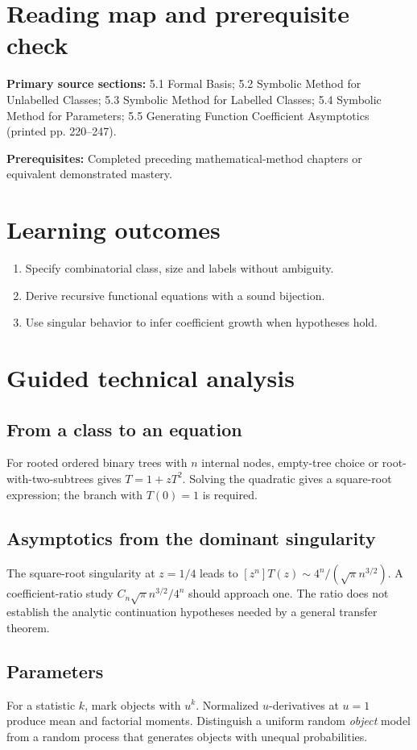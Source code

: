\documentclass[11pt]{article}
\begin{document}
\makedoctocpage
\section{Reading map and prerequisite check}
\noindent\textbf{Primary source sections:} 5.1 Formal Basis; 5.2 Symbolic Method for Unlabelled Classes; 5.3 Symbolic Method for Labelled Classes; 5.4 Symbolic Method for Parameters; 5.5 Generating Function Coefficient Asymptotics (printed pp. 220--247).\par
\noindent\textbf{Prerequisites:} Completed preceding mathematical-method chapters or equivalent demonstrated mastery.\par
\section{Learning outcomes}
\begin{enumerate}
\item Specify combinatorial class, size and labels without ambiguity.
\item Derive recursive functional equations with a sound bijection.
\item Use singular behavior to infer coefficient growth when hypotheses hold.
\end{enumerate}
\section{Guided technical analysis}
\subsection{From a class to an equation}
For rooted ordered binary trees with $n$ internal nodes, empty-tree choice or root-with-two-subtrees gives $T=1+zT^2$. Solving the quadratic gives a square-root expression; the branch with $T(0)=1$ is required.
\subsection{Asymptotics from the dominant singularity}
The square-root singularity at $z=1/4$ leads to $[z^n]T(z)\sim 4^n/(\sqrt\pi n^{3/2})$. A coefficient-ratio study $C_n\sqrt\pi n^{3/2}/4^n$ should approach one. The ratio does not establish the analytic continuation hypotheses needed by a general transfer theorem.
\subsection{Parameters}
For a statistic $k$, mark objects with $u^k$. Normalized $u$-derivatives at $u=1$ produce mean and factorial moments. Distinguish a uniform random \emph{object} model from a random process that generates objects with unequal probabilities.
\end{document}
